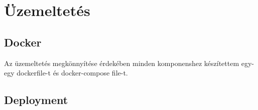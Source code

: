 \chapter{Üzemeltetés}
\section{Docker}
Az üzemeltetés megkönnyítése érdekében minden komponenshez készítettem egy-egy dockerfile-t és docker-compose file-t.

\section{Deployment}
